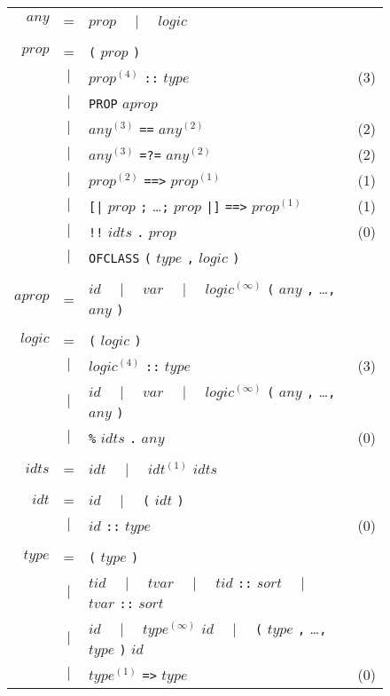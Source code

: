 \begin{figure}
\begin{center}
\begin{tabular}{rclc}
$any$ &=& $prop$ ~~$|$~~ $logic$ \\\\
$prop$ &=& {\tt(} $prop$ {\tt)} \\
     &$|$& $prop^{(4)}$ {\tt::} $type$ & (3) \\
     &$|$& {\tt PROP} $aprop$ \\
     &$|$& $any^{(3)}$ {\tt ==} $any^{(2)}$ & (2) \\
     &$|$& $any^{(3)}$ {\tt =?=} $any^{(2)}$ & (2) \\
     &$|$& $prop^{(2)}$ {\tt ==>} $prop^{(1)}$ & (1) \\
     &$|$& {\tt[|} $prop$ {\tt;} \dots {\tt;} $prop$ {\tt|]} {\tt==>} $prop^{(1)}$ & (1) \\
     &$|$& {\tt!!} $idts$ {\tt.} $prop$ & (0) \\
     &$|$& {\tt OFCLASS} {\tt(} $type$ {\tt,} $logic$ {\tt)} \\\\
$aprop$ &=& $id$ ~~$|$~~ $var$
    ~~$|$~~ $logic^{(\infty)}$ {\tt(} $any$ {\tt,} \dots {\tt,} $any$ {\tt)} \\\\
$logic$ &=& {\tt(} $logic$ {\tt)} \\
      &$|$& $logic^{(4)}$ {\tt::} $type$ & (3) \\
      &$|$& $id$ ~~$|$~~ $var$
    ~~$|$~~ $logic^{(\infty)}$ {\tt(} $any$ {\tt,} \dots {\tt,} $any$ {\tt)} \\
      &$|$& {\tt \%} $idts$ {\tt.} $any$ & (0) \\\\
$idts$ &=& $idt$ ~~$|$~~ $idt^{(1)}$ $idts$ \\\\
$idt$ &=& $id$ ~~$|$~~ {\tt(} $idt$ {\tt)} \\
    &$|$& $id$ {\tt ::} $type$ & (0) \\\\
$type$ &=& {\tt(} $type$ {\tt)} \\
     &$|$& $tid$ ~~$|$~~ $tvar$ ~~$|$~~ $tid$ {\tt::} $sort$
       ~~$|$~~ $tvar$ {\tt::} $sort$ \\
     &$|$& $id$ ~~$|$~~ $type^{(\infty)}$ $id$
                ~~$|$~~ {\tt(} $type$ {\tt,} \dots {\tt,} $type$ {\tt)} $id$ \\
     &$|$& $type^{(1)}$ {\tt =>} $type$ & (0) \\

\end{tabular}
\end{center}
\end{figure}
